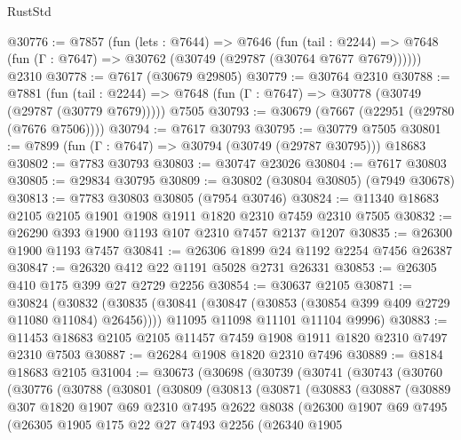 \begin{lexlean}{RustStd}
\begin{coremodule}
@30776 := @7857
    (fun (lets : @7644) =>
    @7646
      (fun (tail : @2244) =>
      @7648 (fun (Γ : @7647) => @30762 (@30749 (@29787 (@30764 @7677 @7679))))))
    @2310
@30778 := @7617 (@30679 @29805)
@30779 := @30764 @2310
@30788 := @7881
    (fun (tail : @2244) => @7648 (fun (Γ : @7647) => @30778 (@30749 (@29787 (@30779 @7679)))))
    @7505
@30793 := @30679 (@7667 (@22951 (@29780 (@7676 @7506))))
@30794 := @7617 @30793
@30795 := @30779 @7505
@30801 := @7899 (fun (Γ : @7647) => @30794 (@30749 (@29787 @30795))) @18683
@30802 := @7783 @30793
@30803 := @30747 @23026
@30804 := @7617 @30803
@30805 := @29834 @30795
@30809 := @30802 (@30804 @30805) (@7949 @30678)
@30813 := @7783 @30803 @30805 (@7954 @30746)
@30824 := @11340 @18683 @2105 @2105 @1901 @1908 @1911 @1820 @2310 @7459 @2310 @7505
@30832 := @26290 @393 @1900 @1193 @107 @2310 @7457 @2137 @1207
@30835 := @26300 @1900 @1193 @7457
@30841 := @26306 @1899 @24 @1192 @2254 @7456 @26387
@30847 := @26320 @412 @22 @1191 @5028 @2731 @26331
@30853 := @26305 @410 @175 @399 @27 @2729 @2256
@30854 := @30637 @2105
@30871 := @30824
    (@30832
      (@30835 (@30841 (@30847 (@30853 (@30854 @399 @409 @2729 @11080 @11084) @26456))))
      @11095
      @11098
      @11101
      @11104
      @9996)
@30883 := @11453 @18683 @2105 @2105 @11457 @7459 @1908 @1911 @1820 @2310 @7497 @2310 @7503
@30887 := @26284 @1908 @1820 @2310 @7496
@30889 := @8184 @18683 @2105
@31004 := @30673
    (@30698
      (@30739
        (@30741
          (@30743
            (@30760
              (@30776
                (@30788
                  (@30801
                    (@30809
                      (@30813
                        (@30871
                          (@30883
                            (@30887
                              (@30889
                                @307
                                @1820
                                @1907
                                @69
                                @2310
                                @7495
                                @2622
                                @8038
                                (@26300
                                  @1907
                                  @69
                                  @7495
                                  (@26305
                                    @1905
                                    @175
                                    @22
                                    @27
                                    @7493
                                    @2256
                                    (@26340
                                      @1905

\end{coremodule}
\end{lexlean}
